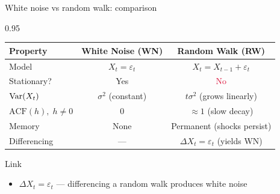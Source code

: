 \documentclass[9pt, aspectratio=169, t]{beamer}
\begin{document}
\begin{frame}{White noise vs random walk: comparison}
    \begin{cminipage}{0.95\textwidth}
        \vspace{-0.2cm}
        {\footnotesize
        \begin{center}
        \renewcommand{\arraystretch}{1.25}
        \begin{tabular}{l c c}
            \hline
            \textbf{Property} & \textbf{White Noise (WN)} & \textbf{Random Walk (RW)} \\
            \hline
            Model & $X_t = \varepsilon_t$ & $X_t = X_{t-1} + \varepsilon_t$ \\
            Stationary? & \textcolor{Forest}{Yes} & \textcolor{Crimson}{No} \\
            $\text{Var}(X_t)$ & $\sigma^2$ (constant) & $t\sigma^2$ (grows linearly) \\
            $\mathrm{ACF}(h),\; h \neq 0$ & $0$ & $\approx 1$ (slow decay) \\
            Memory & None & Permanent (shocks persist) \\
            Differencing & --- & $\Delta X_t = \varepsilon_t$ (yields WN) \\
            \hline
        \end{tabular}
        \end{center}
        \vspace{0.1cm}
        \begin{block}{Link}
            \begin{itemize}\setlength{\itemsep}{0pt}
                \item $\Delta X_t = \varepsilon_t$ --- differencing a random walk produces white noise
            \end{itemize}
        \end{block}
        }
        \hfill{}
    \end{cminipage}
\end{frame}
\end{document}
